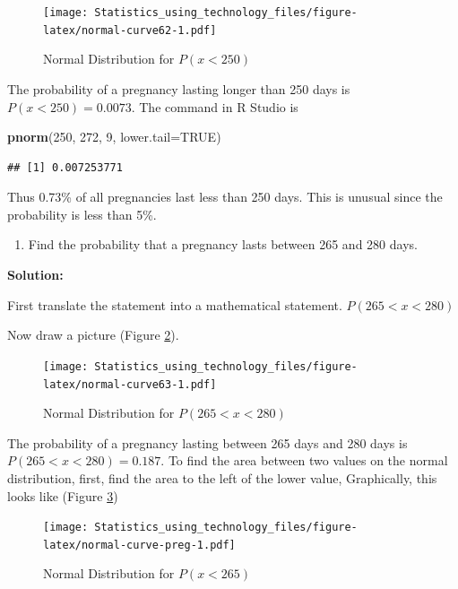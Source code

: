 \documentclass[]{book}
\newenvironment{Shaded}{\begin{snugshade}}{\end{snugshade}}
\newcommand{\DataTypeTok}[1]{\textcolor[rgb]{0.13,0.29,0.53}{#1}}
\newcommand{\DecValTok}[1]{\textcolor[rgb]{0.00,0.00,0.81}{#1}}
\newcommand{\KeywordTok}[1]{\textcolor[rgb]{0.13,0.29,0.53}{\textbf{#1}}}
\newcommand{\NormalTok}[1]{#1}
\newcommand{\OtherTok}[1]{\textcolor[rgb]{0.56,0.35,0.01}{#1}}
\providecommand{\tightlist}{%
  \setlength{\itemsep}{0pt}\setlength{\parskip}{0pt}}
\begin{document}
\begin{figure}
\centering
\texttt{[image: Statistics\_using\_technology\_files/figure-latex/normal-curve62-1.pdf]}
\caption{\label{fig:normal-curve62}Normal Distribution for \(P(x<250)\)}
\end{figure}

The probability of a pregnancy lasting longer than 250 days is \(P(x<250)=0.0073\). The command in R Studio is

\begin{Shaded}
\begin{Highlighting}[]
\KeywordTok{pnorm}\NormalTok{(}\DecValTok{250}\NormalTok{, }\DecValTok{272}\NormalTok{, }\DecValTok{9}\NormalTok{, }\DataTypeTok{lower.tail=}\OtherTok{TRUE}\NormalTok{)}
\end{Highlighting}
\end{Shaded}

\begin{verbatim}
## [1] 0.007253771
\end{verbatim}

Thus 0.73\% of all pregnancies last less than 250 days. This is unusual
since the probability is less than 5\%.

\begin{enumerate}
\def\labelenumi{\alph{enumi}.}
\setcounter{enumi}{3}
\tightlist
\item
  Find the probability that a pregnancy lasts between 265 and 280
  days.
\end{enumerate}

\textbf{Solution:}

First translate the statement into a mathematical statement. \(P(265<x<280)\)

Now draw a picture (Figure \ref{fig:normal-curve63}).



\begin{figure}
\centering
\texttt{[image: Statistics\_using\_technology\_files/figure-latex/normal-curve63-1.pdf]}
\caption{\label{fig:normal-curve63}Normal Distribution for \(P(265<x<280)\)}
\end{figure}

The probability of a pregnancy lasting between 265 days and 280 days is \(P(265<x<280)=0.187\). To find the area between two values on the normal distribution, first, find the area to the left of the lower value, Graphically, this looks like (Figure \ref{fig:normal-curve-preg})



\begin{figure}
\centering
\texttt{[image: Statistics\_using\_technology\_files/figure-latex/normal-curve-preg-1.pdf]}
\caption{\label{fig:normal-curve-preg}Normal Distribution for \(P(x<265)\)}
\end{figure}
\end{document}
